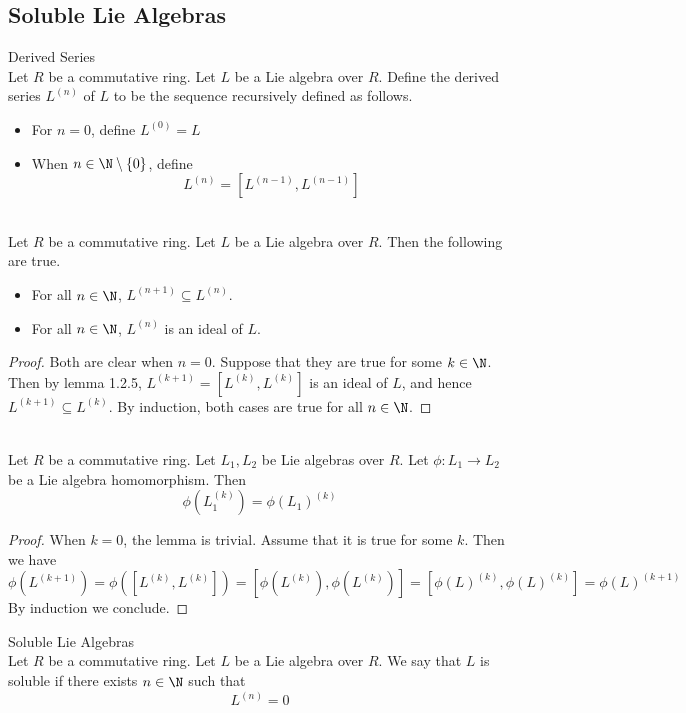 \documentclass[a4paper]{article}
\begin{document}
\subsection{Soluble Lie Algebras}
\begin{defn}{Derived Series}{}\\
Let $R$ be a commutative ring. Let $L$ be a Lie algebra over $R$. Define the derived series $L^{(n)}$ of $L$ to be the sequence recursively defined as follows. 
\begin{itemize}
\item For $n=0$, define $L^{(0)}=L$
\item When $n\in\N\setminus\{0\}$, define $$L^{(n)}=[L^{(n-1)},L^{(n-1)}]$$
\end{itemize}
\end{defn}

\begin{lmm}{}{}\\
Let $R$ be a commutative ring. Let $L$ be a Lie algebra over $R$. Then the following are true. 
\begin{itemize}
\item For all $n\in\N$, $L^{(n+1)}\subseteq L^{(n)}$. 
\item For all $n\in\N$, $L^{(n)}$ is an ideal of $L$. 
\end{itemize} 
\begin{proof}
Both are clear when $n=0$. Suppose that they are true for some $k\in\N$. Then by lemma 1.2.5, $L^{(k+1)}=[L^{(k)},L^{(k)}]$ is an ideal of $L$, and hence $L^{(k+1)}\subseteq L^{(k)}$. By induction, both cases are true for all $n\in\N$. 
\end{proof}
\end{lmm}

\begin{lmm}{}{}\\
Let $R$ be a commutative ring. Let $L_1,L_2$ be Lie algebras over $R$. Let $\phi:L_1\to L_2$ be a Lie algebra homomorphism. Then $$\phi(L_1^{(k)})=\phi(L_1)^{(k)}$$ 
\begin{proof}
When $k=0$, the lemma is trivial. Assume that it is true for some $k$. Then we have $$\phi(L^{(k+1)})=\phi([L^{(k)},L^{(k)}])=[\phi(L^{(k)}),\phi(L^{(k)})]=[\phi(L)^{(k)},\phi(L)^{(k)}]=\phi(L)^{(k+1)}$$ By induction we conclude. 
\end{proof}
\end{lmm}

\begin{defn}{Soluble Lie Algebras}{}\\
Let $R$ be a commutative ring. Let $L$ be a Lie algebra over $R$. We say that $L$ is soluble if there exists $n\in\N$ such that $$L^{(n)}=0$$
\end{defn}
\end{document}
